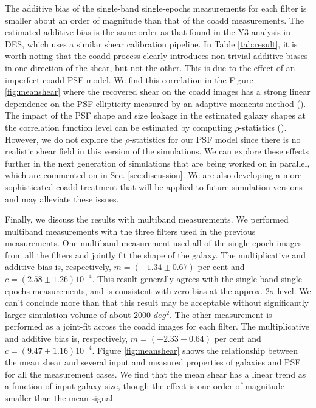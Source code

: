 \documentclass[fleqn,usenatbib]{mnras}
\begin{document}
The additive bias of the single-band single-epochs measurements for each filter is smaller about an order of magnitude than that of the coadd measurements. The estimated additive bias is the same order as that found in the Y3 analysis in DES, which uses a similar shear calibration pipeline. In Table \ref{tab:result}, it is worth noting that the coadd process clearly introduces non-trivial additive biases in one direction of the shear, but not the other. This is due to the effect of an imperfect coadd PSF model. We find this correlation in the Figure \ref{fig:meanshear} where the recovered shear on the coadd images has a strong linear dependence on the PSF ellipticity measured by an adaptive moments method (\citealt{2003MNRAS.343..459H}). The impact of the PSF shape and size leakage in the estimated galaxy shapes at the correlation function level can be estimated by computing $\rho$-statistics (\citealt{2008A&A...484...67P, 2010MNRAS.404..350R, 2016MNRAS.460.2245J}). However, we do not explore the $\rho$-statistics for our PSF model since there is no realistic shear field in this version of the simulations. We can explore these effects further in the next generation of simulations that are being worked on in parallel, which are commented on in Sec. \ref{sec:discussion}. We are also developing a more sophisticated coadd treatment that will be applied to future simulation versions and may alleviate these issues.

Finally, we discuss the results with multiband measurements. We performed multiband measurements with the three filters used in the previous measurements. One multiband measurement used all of the single epoch images from all the filters and jointly fit the shape of the galaxy. The multiplicative and additive bias is, respectively, $m=(-1.34\pm0.67)$ per cent and $c=(2.58\pm1.26)10^{-4}$. This result generally agrees with the single-band single-epochs measurements, and is consistent with zero bias at the approx. 2$\sigma$ level. We can't conclude more than that this result may be acceptable without significantly larger simulation volume of about 2000 $deg^{2}$. The other measurement is performed as a joint-fit across the coadd images for each filter. The multiplicative and additive bias is, respectively, $m=(-2.33\pm0.64)$ per cent and $c=(9.47\pm1.16)10^{-4}$. Figure \ref{fig:meanshear} shows the relationship between the mean shear and several input and measured properties of galaxies and PSF for all the measurement cases. We find that the mean shear has a linear trend as a function of input galaxy size, though the effect is one order of magnitude smaller than the mean signal.
\end{document}
